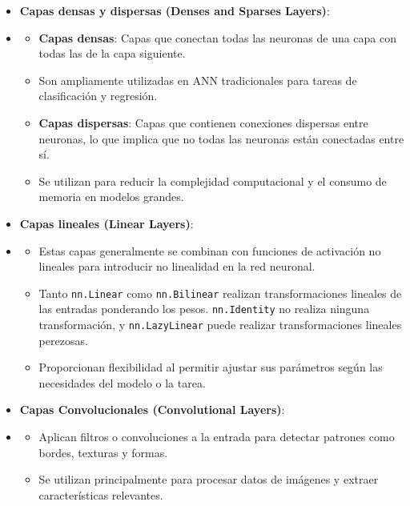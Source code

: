 \begin{itemize}
    \item \textbf{Capas densas y dispersas (Denses and Sparses Layers)}:
    \item[]
        \begin{itemize}
            \item \textbf{Capas densas}: Capas que conectan todas las neuronas de una capa con todas las de la capa siguiente.
            \item[] Son ampliamente utilizadas en \gls{ANN} tradicionales  para tareas de clasificación y regresión.
            \item \textbf{Capas dispersas}: Capas que contienen conexiones dispersas entre neuronas, lo que implica que no todas las neuronas están conectadas entre sí.
            \item[] Se utilizan para reducir la complejidad computacional y el consumo de memoria en modelos grandes.
        \end{itemize}
    \item \textbf{Capas lineales (Linear Layers)}:
    \item[]
        \begin{itemize}
            \item Estas capas generalmente se combinan con funciones de activación no lineales para introducir no linealidad en la red neuronal.
            \item Tanto \texttt{nn.Linear} como \texttt{nn.Bilinear} realizan transformaciones lineales de las entradas ponderando los pesos. \texttt{nn.Identity} no realiza ninguna transformación, y \texttt{nn.LazyLinear} puede realizar transformaciones lineales perezosas.
            \item Proporcionan flexibilidad al permitir ajustar sus parámetros según las necesidades del modelo o la tarea.
        \end{itemize}
    \item \textbf{Capas Convolucionales (Convolutional Layers)}:
    \item[]
        \begin{itemize}
            \item Aplican filtros o convoluciones a la entrada para detectar patrones como bordes, texturas y formas.
            \item Se utilizan principalmente para procesar datos de imágenes y extraer características relevantes.

\end{itemize}
\end{itemize}
